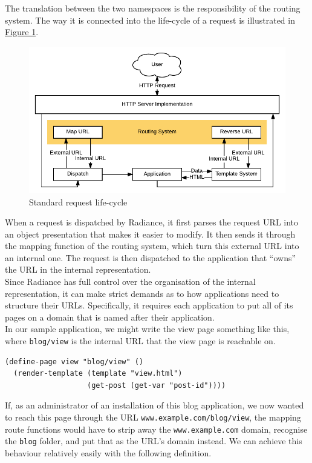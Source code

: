 \documentclass{sig-alternate}
\begin{document}
The translation between the two namespaces is the responsibility of the routing system. The way it is connected into the life-cycle of a request is illustrated in \hyperref[requestcycle]{Figure 1}. \\

\begin{figure}[h]
  \includegraphics[width=\columnwidth]{request}
  \caption{Standard request life-cycle}
  \label{requestcycle}
\end{figure}

When a request is dispatched by Radiance, it first parses the request URL into an object presentation that makes it easier to modify. It then sends it through the mapping function of the routing system, which turn this external URL into an internal one. The request is then dispatched to the application that ``owns'' the URL in the internal representation. \\

Since Radiance has full control over the organisation of the internal representation, it can make strict demands as to how applications need to structure their URLs. Specifically, it requires each application to put all of its pages on a domain that is named after their application. \\

In our sample application, we might write the view page something like this, where \texttt{blog/view} is the internal URL that the view page is reachable on.

\begin{verbatim}
(define-page view "blog/view" ()
  (render-template (template "view.html")
                   (get-post (get-var "post-id"))))
\end{verbatim}

If, as an administrator of an installation of this blog application, we now wanted to reach this page through the URL \texttt{www.example.com/blog/view}, the mapping route functions would have to strip away the \texttt{www.example.com} domain, recognise the \texttt{blog} folder, and put that as the URL's domain instead. We can achieve this behaviour relatively easily with the following definition.
\end{document}
